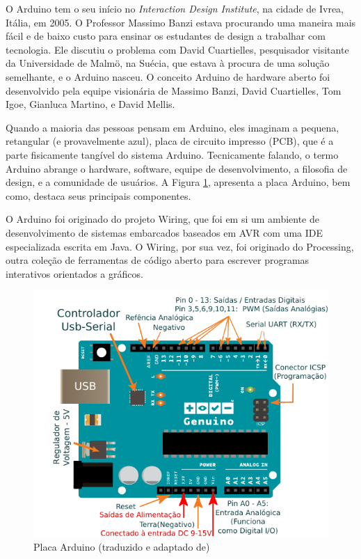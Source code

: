 O Arduino tem o seu início no \emph{Interaction Design Institute},
na cidade de Ivrea, Itália, em 2005. O Professor Massimo Banzi estava
procurando uma maneira mais fácil e de baixo custo para ensinar os
estudantes de design a trabalhar com tecnologia. Ele discutiu o problema
com David Cuartielles, pesquisador visitante da Universidade de Malmö,
na Suécia, que estava à procura de uma solução semelhante, e o Arduino
nasceu\cite{arduino:evans:2013}. O conceito Arduino de hardware aberto
foi desenvolvido pela equipe visionária de Massimo Banzi, David Cuartielles,
Tom Igoe, Gianluca Martino, e David Mellis\cite{arduino:barrett:2012}.

Quando a maioria das pessoas pensam em Arduino, eles imaginam a pequena,
retangular (e provavelmente azul), placa de circuito impresso (PCB),
que é a parte fisicamente tangível do sistema Arduino. Tecnicamente
falando, o termo Arduino abrange o hardware, software, equipe de desenvolvimento,
a filosofia de design, e a comunidade de usuários. A Figura \ref{fig:arduino},
apresenta a placa Arduino, bem como, destaca seus principais componentes.

O Arduino foi originado do projeto Wiring\cite{Wiring:2016}, que
foi em si um ambiente de desenvolvimento de sistemas embarcados baseados
em AVR com uma IDE especializada escrita em Java. O Wiring, por sua
vez, foi originado do Processing\cite{Processing:2016}, outra coleção
de ferramentas de código aberto para escrever programas interativos
orientados a gráficos.

\begin{figure}[h]
\begin{centering}
\includegraphics[width=0.8\linewidth]{Imagens/Cap_2/arduino}
\par\end{centering}
\caption[Placa Arduino ]{Placa Arduino (traduzido e adaptado de\cite{url:arduino:bord}) \label{fig:arduino}}
\end{figure}



